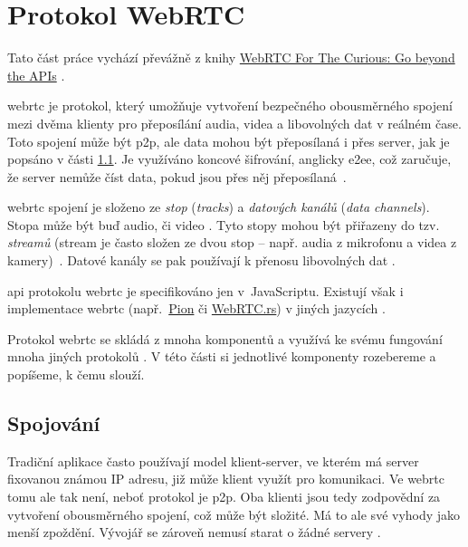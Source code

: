 \section{Protokol WebRTC}\label{webRTC}

Tato část práce vychází převážně z knihy
\href{https://webrtcforthecurious.com/}{WebRTC For The Curious: Go beyond the
    APIs} \parencite{WebRTCForTheCurious}.

\gls{webrtc} je protokol, který umožňuje vytvoření bezpečného obousměrného
spojení mezi dvěma klienty pro přeposílání audia, videa a libovolných dat v
reálném čase. Toto spojení může být \gls{p2p}, ale data mohou být přeposílaná i
přes server, jak je popsáno v části \ref{connecting}. Je využíváno koncové
šifrování, anglicky \gls{e2ee}, což zaručuje, že server nemůže číst data, pokud
jsou přes něj přeposílaná~\parencite{WebRTCForTheCurious}.

\gls{webrtc} spojení je složeno ze \textit{stop} (\textit{tracks}) a
\textit{datových kanálů} (\textit{data channels}). Stopa může být buď audio,
či video \parencite{MDN-WebRTC-MediaStreamTrack}. Tyto stopy mohou být
přiřazeny do tzv. \textit{streamů} (stream je často složen ze dvou stop --
např. audia z mikrofonu a videa z
kamery)~\parencite{MDN-WebRTC-MediaStream}. Datové kanály se pak používají k
přenosu libovolných dat \parencite{WebRTCORG-GettingStarted-DataChannels}.

\gls{api} protokolu \gls{webrtc} je specifikováno jen v~JavaScriptu. Existují
však i implementace \gls{webrtc}
(např.~\href{https://github.com/pion/webrtc}{Pion} či
\href{https://github.com/webrtc-rs/webrtc}{WebRTC.rs}) v jiných jazycích
\parencite{WebRTCForTheCurious,GitHub-Pion-WebRTC,GitHub-WebRTCRS-WebRTC}.

Protokol \gls{webrtc} se skládá z mnoha komponentů a využívá ke svému fungování
mnoha jiných protokolů \parencite{WebRTCForTheCurious}. V této části si
jednotlivé komponenty rozebereme a popíšeme, k čemu slouží.

\subsection{Spojování}\label{connecting}

Tradiční aplikace často používají model klient-server, ve kterém má server
fixovanou známou IP adresu, již může klient využít pro komunikaci. Ve
\gls{webrtc} tomu ale tak není, neboť protokol je \gls{p2p}. Oba klienti jsou
tedy zodpovědní za vytvoření obousměrného spojení, což může být složité. Má to
ale své vyhody jako menší zpoždění. Vývojář se zároveň nemusí starat o žádné
servery \parencite{WebRTCForTheCurious}.

